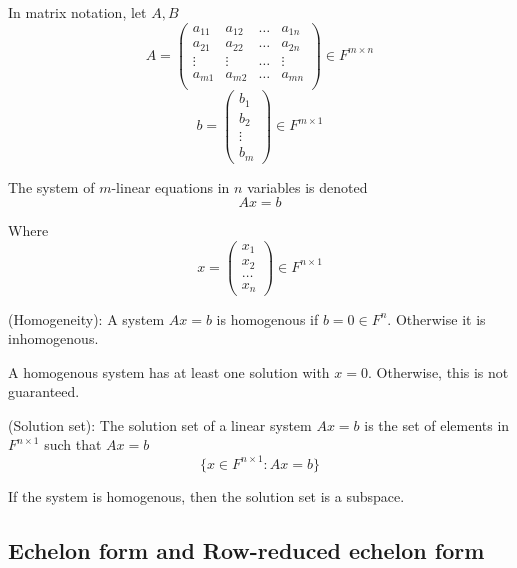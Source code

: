 \begin{remark}
In matrix notation, let $A, B$ 
\[
    A = \begin{pmatrix} 
        a_{11} & a_{12} & \hdots & a_{1n} \\
        a_{21} & a_{22} & \hdots & a_{2n} \\
        \vdots & \vdots & \hdots & \vdots \\
        a_{m1} & a_{m2} & \hdots & a_{mn} \\
    \end{pmatrix} \in F^{m \times n}
\]
\[
    b = \begin{pmatrix} 
        b_1 \\ b_2 \\ \vdots \\ b_m  
    \end{pmatrix} \in F^{m \times 1}
\]

The system of $m$-linear equations in $n$ variables is denoted 
\[
  A x = b
\]

Where 
\[
  x = \begin{pmatrix} x_1 \\ x_2 \\ \hdots \\ x_n \end{pmatrix}  \in F^{n \times 1 }
\]
\end{remark}


\begin{definition}
(Homogeneity): A system $Ax = b$ is homogenous if $b = 0 \in F^{n}$. Otherwise it is inhomogenous. 
\end{definition} 

\begin{remark}
A homogenous system has at least one solution with $x = 0$. Otherwise, this is not guaranteed. 
\end{remark}

\begin{definition}
(Solution set): The solution set of a linear system $Ax = b$ is the set of elements in $F^{n \times 1}$ such that $Ax = b$
    \[
        \{ x \in F^{n \times 1} : Ax = b\} 
    \]
\end{definition} 

\begin{remark}
If the system is homogenous, then the solution set is a subspace. 
\end{remark}


\subsection{Echelon form and Row-reduced echelon form}

